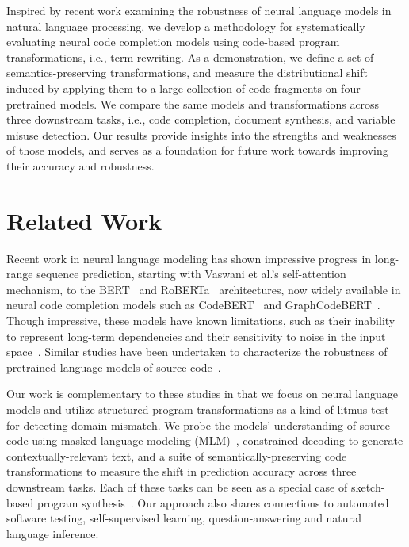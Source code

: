 \documentclass[usenames,dvipsnames]{article} %
\begin{document}
  Inspired by recent work examining the robustness of neural language models in natural language processing, we develop a methodology for systematically evaluating neural code completion models using code-based program transformations, i.e., term rewriting. As a demonstration, we define a set of semantics-preserving transformations, and measure the distributional shift induced by applying them to a large collection of code fragments on four pretrained models. We compare the same models and transformations across three downstream tasks, i.e., code completion, document synthesis, and variable misuse detection. Our results provide insights into the strengths and weaknesses of those models, and serves as a foundation for future work towards improving their accuracy and robustness.

  \section{Related Work}\label{sec:related_work}

  Recent work in neural language modeling has shown impressive progress in long-range sequence prediction, starting with Vaswani et al.'s self-attention~\citep{vaswani2017attention} mechanism, to the BERT~\citep{devlin2018bert} and RoBERTa~\citep{liu2019roberta} architectures, now widely available in neural code completion models such as CodeBERT~\citep{feng2020codebert} and GraphCodeBERT~\citep{guo2021graphcodebert}. Though impressive, these models have known limitations, such as their inability to represent long-term dependencies and their sensitivity to noise in the input space~\cite{sun2020adv}. Similar studies have been undertaken to characterize the robustness of pretrained language models of source code~\citep{hellendoorn2017deep}.

  Our work is complementary to these studies in that we focus on neural language models and utilize structured program transformations as a kind of litmus test for detecting domain mismatch. We probe the models' understanding of source code using masked language modeling (MLM)~\citep{sinha2021masked}, constrained decoding to generate contextually-relevant text, and a suite of semantically-preserving code transformations to measure the shift in prediction accuracy across three downstream tasks. Each of these tasks can be seen as a special case of sketch-based program synthesis~\citep{solar2008program}. Our approach also shares connections to automated software testing, self-supervised learning, question-answering and natural language inference.
\end{document}
